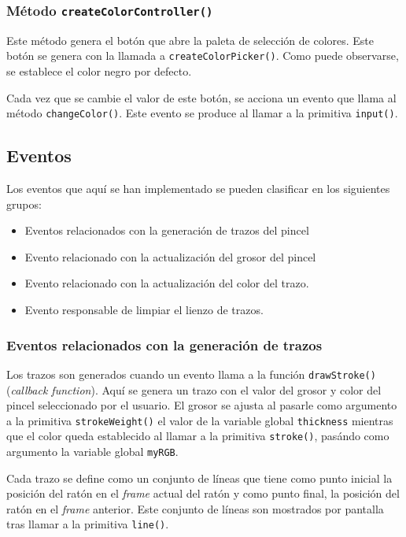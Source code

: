\documentclass[10pt,a4paper]{report}
\begin{document}
	\subsubsection{Método \texttt{createColorController()}}\label{panel:colorpicker}
	Este método genera el botón que abre la paleta de selección de colores. Este botón se genera con la llamada a \texttt{createColorPicker()}. Como puede observarse, se establece el color negro por defecto.
	
	Cada vez que se cambie el valor de este botón, se acciona un evento que llama al método \texttt{changeColor()}. Este evento se produce al llamar a la primitiva \texttt{input()}.
		
		
	
	
	\subsection{Eventos}\label{sub:eventos}
	Los eventos que aquí se han implementado se pueden clasificar en los siguientes grupos:
	\begin{itemize}
		\item Eventos relacionados con la generación de trazos del pincel
		\item Evento relacionado con la actualización del grosor del pincel
		\item Evento relacionado con la actualización del color del trazo.
		\item Evento responsable de limpiar el lienzo de trazos.
	\end{itemize}
	
	\subsubsection{Eventos relacionados con la generación de trazos}
	Los trazos son generados cuando un evento llama a la función \texttt{drawStroke()} (\textit{callback function}). Aquí se genera un trazo con el valor del grosor y color del pincel seleccionado por el usuario. El grosor se ajusta al pasarle como argumento a la primitiva \texttt{strokeWeight()} el valor de la variable global \texttt{thickness} mientras que el color queda establecido al llamar a la primitiva \texttt{stroke()}, pasándo como argumento la variable global \texttt{myRGB}.
	
	Cada trazo se define como un conjunto de líneas que tiene como punto inicial la posición del ratón en el \textit{frame} actual del ratón y como punto final, la posición del ratón en el \textit{frame} anterior. Este conjunto de líneas son mostrados por pantalla tras llamar a la primitiva \texttt{line()}. 
	
\end{document}
